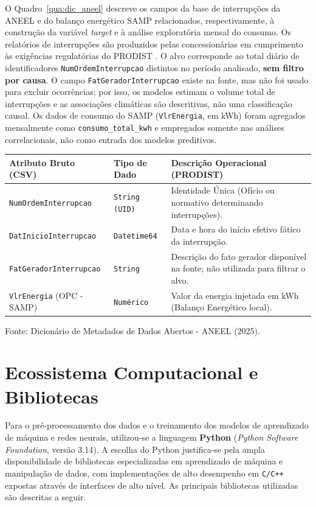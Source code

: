 O Quadro~\ref{qua:dic_aneel} descreve os campos da base de interrupções da ANEEL e do balanço energético SAMP relacionados, respectivamente, à construção da variável \textit{target} e à análise exploratória mensal do consumo. Os relatórios de interrupções são produzidos pelas concessionárias em cumprimento às exigências regulatórias do PRODIST \cite{aneel2023prodist}. O alvo corresponde ao total diário de identificadores \texttt{NumOrdemInterrupcao} distintos no período analisado, \textbf{sem filtro por causa}. O campo \texttt{FatGeradorInterrupcao} existe na fonte, mas não foi usado para excluir ocorrências; por isso, os modelos estimam o volume total de interrupções e as associações climáticas são descritivas, não uma classificação causal. Os dados de consumo do SAMP (\texttt{VlrEnergia}, em kWh) foram agregados mensalmente como \texttt{consumo\_total\_kwh} e empregados somente nas análises correlacionais, não como entrada dos modelos preditivos.

\begin{quadro}[H]
\caption{Dicionário Oficial de Metadados (Pilar ANEEL e SAMP Balanço)}
\label{qua:dic_aneel}
\begin{center}
\small
\begin{tabular}{p{4.5cm} p{2.2cm} p{6cm}}
\toprule
\textbf{Atributo Bruto (CSV)} & \textbf{Tipo de Dado} & \textbf{Descrição Operacional (PRODIST)} \\
\midrule
\texttt{NumOrdemInterrupcao} & \texttt{String (UID)} & Identidade Única (Ofício ou normativo determinando interrupções). \\
\texttt{DatInicioInterrupcao} & \texttt{Datetime64} & Data e hora do início efetivo fático da interrupção. \\
\texttt{FatGeradorInterrupcao} & \texttt{String} & Descrição do fato gerador disponível na fonte; não utilizada para filtrar o alvo. \\
\texttt{VlrEnergia} (OPC - SAMP) & \texttt{Numérico} & Valor da energia injetada em kWh (Balanço Energético local). \\
\bottomrule
\end{tabular}
\normalsize
\end{center}
\small{Fonte: Dicionário de Metadados de Dados Abertos - ANEEL (2025).}
\end{quadro}



\section{Ecossistema Computacional e Bibliotecas}\label{sec:computacional}
Para o pré-processamento dos dados e o treinamento dos modelos de aprendizado de máquina e redes neurais, utilizou-se a linguagem \textbf{Python} (\textit{Python Software Foundation}, versão 3.14). A escolha do Python justifica-se pela ampla disponibilidade de bibliotecas especializadas em aprendizado de máquina e manipulação de dados, com implementações de alto desempenho em \texttt{C/C++} expostas através de interfaces de alto nível. As principais bibliotecas utilizadas são descritas a seguir.

